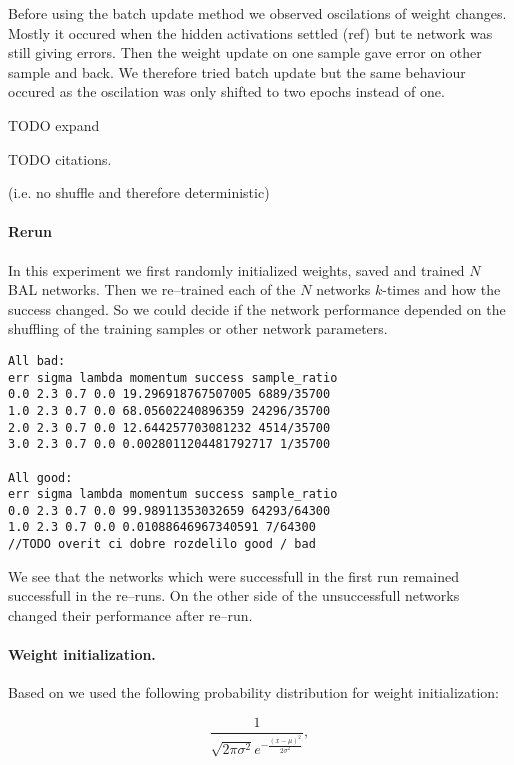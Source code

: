 Before using the batch update method we observed oscilations of weight changes. Mostly it occured when the hidden activations settled (ref) but te network was still giving errors. Then the weight update on one sample gave error on other sample and back. We therefore tried batch update but the same behaviour occured as the oscilation was only shifted to two epochs instead of one.  

TODO expand 

TODO citations. 

(i.e. no shuffle and therefore deterministic)

\paragraph{Rerun} 

In this experiment we first randomly initialized weights, saved and trained $N$ BAL networks. Then we re--trained each of the $N$ networks $k$-times and how the success changed. So we could decide if the network performance depended on the shuffling of the training samples or other network parameters. 

\begin{lstlisting}
All bad: 
err sigma lambda momentum success sample_ratio
0.0 2.3 0.7 0.0 19.296918767507005 6889/35700
1.0 2.3 0.7 0.0 68.05602240896359 24296/35700
2.0 2.3 0.7 0.0 12.644257703081232 4514/35700
3.0 2.3 0.7 0.0 0.0028011204481792717 1/35700

All good: 
err sigma lambda momentum success sample_ratio
0.0 2.3 0.7 0.0 99.98911353032659 64293/64300
1.0 2.3 0.7 0.0 0.01088646967340591 7/64300
//TODO overit ci dobre rozdelilo good / bad
\end{lstlisting}

We see that the networks which were successfull in the first run remained successfull in the re--runs. On the other side of the unsuccessfull networks changed their performance after re--run. 

\paragraph{Weight initialization.} 

Based on \citet{o1996bio} we used the following probability distribution for weight initialization: 

\begin{equation} 
\frac{1}{\sqrt{2\pi \sigma^2} e^{-\frac{(x-\mu)^2}{2\sigma^2}}},
\end{equation} 

